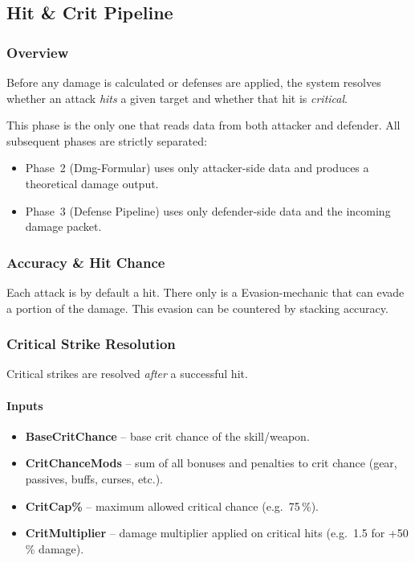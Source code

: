 
\subsection{Hit \& Crit Pipeline}
\label{subsec:hit-crit}

\subsubsection{Overview}

Before any damage is calculated or defenses are applied, the system resolves whether
an attack \emph{hits} a given target and whether that hit is \emph{critical}.

This phase is the only one that reads data from both attacker and defender.
All subsequent phases are strictly separated:
\begin{itemize}
	\item Phase~2 (Dmg-Formular) uses only attacker-side data and produces a theoretical damage output.
	\item Phase~3 (Defense Pipeline) uses only defender-side data and the incoming damage packet.
\end{itemize}

\subsubsection{Accuracy \& Hit Chance}

Each attack is by default a hit. There only is a Evasion-mechanic that can evade a portion of the damage. This evasion can be countered by stacking accuracy.


\subsubsection{Critical Strike Resolution}

Critical strikes are resolved \emph{after} a successful hit.

\paragraph{Inputs}

\begin{itemize}
	\item \textbf{BaseCritChance} – base crit chance of the skill/weapon.
	\item \textbf{CritChanceMods} – sum of all bonuses and penalties to crit chance
	(gear, passives, buffs, curses, etc.).
	\item \textbf{CritCap\%} – maximum allowed critical chance (e.g.\ 75\,\%).
	\item \textbf{CritMultiplier} – damage multiplier applied on critical hits
	(e.g.\ 1.5 for +50\,\% damage).
\end{itemize}

